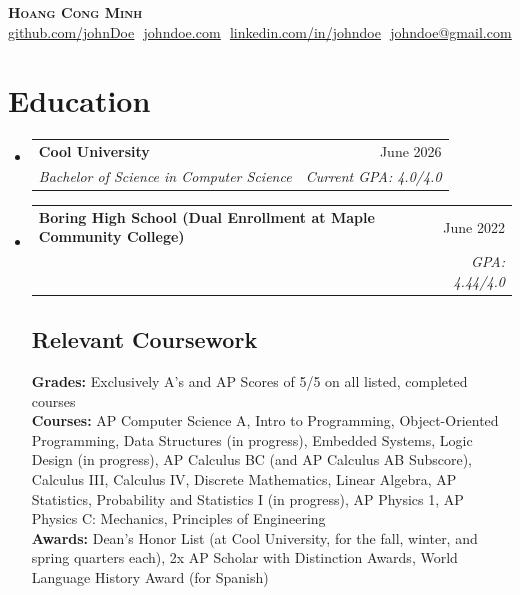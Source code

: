 \documentclass[letterpaper,11pt]{article}
\makeatletter
\newcommand{\resumeSubheading}[4]{
  \vspace{-2pt}\item
    \begin{tabular*}{0.97\textwidth}[t]{l@{\extracolsep{\fill}}r}
      \textbf{#1} & #2 \\
      \textit{\small#3} & \textit{\small #4} \\
    \end{tabular*}\vspace{-7pt}
}
\newcommand{\resumeSubHeadingListStart}{\begin{itemize}[leftmargin=0.15in, label={}]}
\newcommand{\resumeSubHeadingListEnd}{\end{itemize}}
\makeatother
\begin{document}

\begin{center}
    \textbf{\Huge \scshape Hoang Cong Minh} \\ \vspace{3pt}
    \small
    \href{https://github.com/johnDoe}{\underline{github.com/johnDoe}} $  $
    \href{https://www.johndoe.com}
    {\underline{johndoe.com}} $  $
    \href{https://linkedin.com/in/johndoe}{\underline{linkedin.com/in/johndoe}} $  $
    \href{mailto:johndoe@gmail.com}
    {\underline{johndoe@gmail.com}}
\end{center}

\section{Education}
  \resumeSubHeadingListStart
  
    \resumeSubheading
      {Cool University}{June 2026}
      {Bachelor of Science in Computer Science}{Current GPA: 4.0/4.0}
      
    \resumeSubheading
      {Boring High School \footnotesize{(Dual Enrollment at Maple Community College)}}{June 2022}
      {}{GPA: 4.44/4.0}

    \vspace{-10pt}
    \subsection{Relevant Coursework}
      \textbf{Grades:} Exclusively A’s and AP Scores of 5/5 on all listed, completed courses\\
      \textbf{Courses:} AP Computer Science A, Intro to Programming, Object-Oriented Programming, Data Structures (in progress), Embedded Systems, Logic Design (in progress), AP Calculus BC (and AP Calculus AB Subscore), Calculus III, Calculus IV, Discrete Mathematics, Linear Algebra, AP Statistics, Probability and Statistics I (in progress), AP Physics 1, AP Physics C: Mechanics, Principles of Engineering\\
      \textbf{Awards:} Dean's Honor List (at Cool University, for the fall, winter, and spring quarters each), 2x AP Scholar with Distinction Awards, World Language History Award (for Spanish)

  \resumeSubHeadingListEnd

\end{document}
